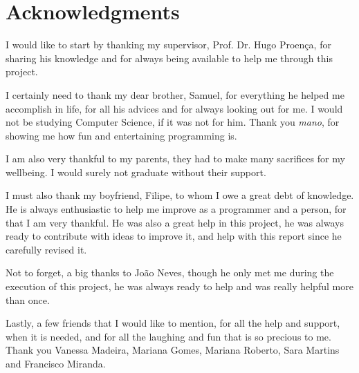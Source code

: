 \documentclass[titlepage,12pt,a4paper,times]{book}
\begin{document}


\clearpage{\thispagestyle{empty}\cleardoublepage}

\frontmatter
\chapter*{Acknowledgments}
\label{chap:ack}

I would like to start by thanking my supervisor, Prof. Dr. Hugo Proença, for
sharing his knowledge and for always being available to help me through this
project.

I certainly need to thank my dear brother, Samuel, for everything he helped me
accomplish in life, for all his advices and for always looking out for me. I
would not be studying Computer Science, if it was not for him. Thank you
\emph{mano}, for showing me how fun and entertaining programming is.

I am also very thankful to my parents, they had to make many sacrifices
for my wellbeing. I would surely not graduate without their support.

I must also thank my boyfriend, Filipe, to whom I owe a great debt of
knowledge. He is always enthusiastic to help me improve as a programmer and a
person, for that I am very thankful. He was also a great help in this project,
he was always ready to contribute with ideas to improve it, and help with this
report since he carefully revised it.

Not to forget, a big thanks to João Neves, though he only met me during the
execution of this project, he was always ready to help and was really helpful
more than once.

Lastly, a few friends that I would like to mention, for all the help and
support, when it is needed, and for all the laughing and fun that is so
precious to me.  Thank you Vanessa Madeira, Mariana Gomes, Mariana Roberto,
Sara Martins and Francisco Miranda.
\tableofcontents

\clearpage{\thispagestyle{empty}\cleardoublepage}

\listoffigures

\clearpage{\thispagestyle{empty}\cleardoublepage}

\listoftables
\clearpage{\thispagestyle{empty}\cleardoublepage}

\end{document}
